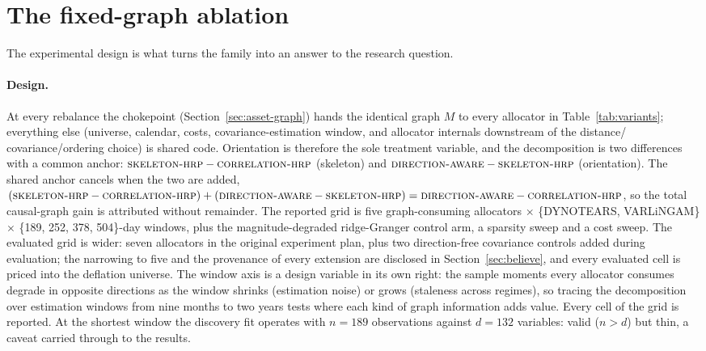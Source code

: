\section{The fixed-graph ablation}
\label{sec:ablation-design}

The experimental design is what turns the family into an answer to the research
question.

\paragraph{Design.} At every rebalance the chokepoint
(Section~\ref{sec:asset-graph}) hands the identical graph $M$ to
every allocator in Table~\ref{tab:variants}; everything else (universe,
calendar, costs,
covariance-estimation window, and allocator internals downstream of the
distance/
covariance/ordering choice) is shared code. Orientation is therefore the
sole treatment variable, and the decomposition is two differences with a
common anchor: $\textsc{skeleton-hrp}{}-\textsc{correlation-hrp}{}$ (skeleton) and
$\textsc{direction-aware}{}-\textsc{skeleton-hrp}{}$ (orientation). The shared anchor cancels when
the two are added,
$(\textsc{skeleton-hrp}{}-\textsc{correlation-hrp}{}) + (\textsc{direction-aware}{}-\textsc{skeleton-hrp}{}) =
\textsc{direction-aware}{}-\textsc{correlation-hrp}{}$, so the total causal-graph gain is attributed
without remainder. The reported grid is five graph-consuming allocators $\times$
\{DYNOTEARS, VARLiNGAM\} $\times$ \{189, 252, 378, 504\}-day windows, plus
the magnitude-degraded ridge-Granger control arm, a sparsity sweep and a cost
sweep. The evaluated grid is wider: seven allocators in the original
experiment plan, plus two direction-free
covariance controls added during
evaluation; the narrowing to five and the provenance of every extension
are disclosed in Section~\ref{sec:believe}, and every evaluated cell is
priced into the deflation universe. The window axis is a
design variable in its own right: the sample moments every allocator
consumes degrade in opposite directions as the window shrinks (estimation
noise) or grows (staleness across regimes), so tracing the decomposition
over estimation windows from nine months to two years tests where each kind of
graph information adds value. Every cell of the grid is reported. At the
shortest window the discovery
fit
operates with $n=189$ observations against $d=132$ variables: valid
($n>d$) but thin, a caveat carried through to the results.

